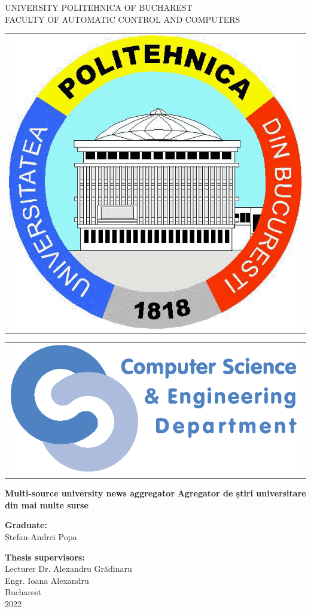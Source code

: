 \thispagestyle{empty}
\begin{center}
\large
UNIVERSITY POLITEHNICA OF BUCHAREST \\
FACULTY OF AUTOMATIC CONTROL AND COMPUTERS \\

\begin{tabular}[t]{@{}l}
	\includegraphics[scale=0.16]{figures/logos/upb.png}
\end{tabular}
\hfill
\begin{tabular}[t]{l@{}}
	\includegraphics[scale=0.3]{figures/logos/cse.png}
\end{tabular}
\vfill\noindent

{\LARGE
	\textbf{Multi-source university news aggregator}
	\textbf{Agregator de știri universitare din mai multe surse}
}

\vspace{3cm}
\textbf{Graduate:}\\
Ștefan-Andrei Popa

\bigskip
\bigskip

\textbf{Thesis supervisors:}\\
Lecturer Dr. Alexandru Grădinaru \\
Engr. Ioana Alexandru \\

Bucharest \\
2022 \\
\vspace*{1cm}
\end{center}
